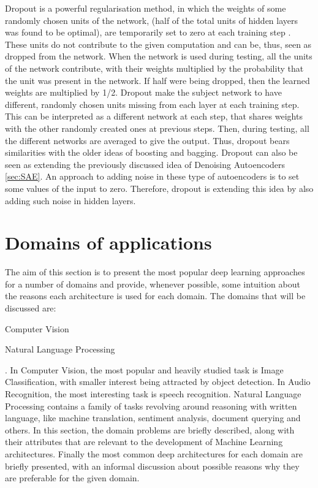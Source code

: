\documentclass[a4paper]{article}
\begin{document}
		Dropout is a powerful regularisation method, in which the weights of some randomly chosen units of the network,  (half of the total units of hidden layers was found to be optimal), are temporarily set to zero at each training step \cite{Srivastava2014,Dahl2013}. These units do not contribute to the given computation and can be, thus, seen as dropped from the network. When the network is used during testing, all the units of the network contribute, with their weights multiplied by the probability that the unit was present in the network. If half were being dropped, then the learned weights are multiplied by 1/2.
		Dropout make the subject network to have different, randomly chosen units missing from each layer at each training step. This can be interpreted as a different network at each step, that shares weights with the other randomly created ones at previous steps. Then, during testing, all the different networks are averaged to give the output. Thus, dropout bears similarities with the older ideas of boosting and bagging. Dropout can also be seen as extending the previously discussed idea of Denoising Autoencoders \ref{sec:SAE}. An approach to adding noise in these type of autoencoders is to set some values of the input to zero. Therefore, dropout is extending this idea by also adding such noise in hidden layers.
\section{Domains of applications}
\label{sec:Domains}
	The aim of this section is to present the most popular deep learning approaches for a number of domains and provide, whenever possible, some intuition about the reasons each architecture is used for each domain. The domains that will be discussed are:
	\begin{enumerate*}
		\item Computer Vision
		\item Natural Language Processing
	\end{enumerate*}.	
	In Computer Vision, the most popular and heavily studied task is Image Classification, with smaller interest being attracted by object detection. In Audio Recognition, the most interesting task is speech recognition. Natural Language Processing contains a family of tasks revolving around reasoning with written language, like machine translation, sentiment analysis, document querying and others. 
	In this section, the domain problems are briefly described, along with their attributes that are relevant to the development of Machine Learning architectures. Finally the most common deep architectures for each domain are briefly presented, with an informal discussion about possible reasons why they are preferable for the given domain. 
\end{document}
